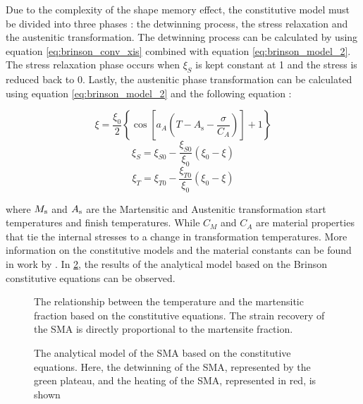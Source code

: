 Due to the complexity of the shape memory effect, the constitutive model must be divided into three phases : the detwinning process, the stress relaxation and the austenitic transformation. The detwinning process can be calculated by using equation \ref{eq:brinson_conv_xis} combined with equation \ref{eq:brinson_model_2}. The stress relaxation phase occurs when $\xi_S$ is kept constant at 1 and the stress is reduced back to 0. Lastly, the austenitic phase transformation can be calculated using equation \ref{eq:brinson_model_2} and the following equation :

\begin{equation}
  \label{eq:A_transf}
  \xi = \frac{\xi_0}{2}\left\{\cos\left[a_A(T-A_\mathrm{s}-\frac{\sigma}{C_A})\right]+1\right\}
\end{equation}
\begin{equation}
    \label{eq:a-transf_1}
    \xi_S = \xi_{S0} - \frac{\xi_{S0}}{\xi_0}(\xi_0-\xi)
\end{equation}
\begin{equation}
    \label{eq:a-transf_2}
    \xi_T = \xi_{T0} - \frac{\xi_{T0}}{\xi_0}(\xi_0-\xi)
\end{equation}

where $M_\mathrm{s}$ and $A_\mathrm{s}$ are the Martensitic and Austenitic transformation start temperatures and finish temperatures. While $C_M$ and $C_A$ are material properties that tie the internal stresses to a change in transformation temperatures. More information on the constitutive models and the material constants can be found in work by \cite{brinsonOneDimensionalConstitutiveBehavior1993}. In \cref{fig:brinson-model-stress-strain}, the results of the analytical model based on the Brinson constitutive equations can be observed.

\begin{figure}[hbt]
    \centering
    \resizebox{0.75\textwidth}{!}{}
    \caption{The relationship between the temperature and the martensitic fraction based on the \cite{brinsonOneDimensionalConstitutiveBehavior1993} constitutive equations. The strain recovery of the SMA is directly proportional to the martensite fraction.}
    \label{fig:sma-temperature-transformation-model}
\end{figure}
\begin{figure}[hbt]
    \centering
    \resizebox{0.75\textwidth}{!}{}
    \caption{The analytical model of the SMA based on the \cite{brinsonOneDimensionalConstitutiveBehavior1993} constitutive equations. Here, the detwinning of the SMA, represented by the green plateau, and the heating of the SMA, represented in red, is shown}
    \label{fig:brinson-model-stress-strain}
\end{figure}
